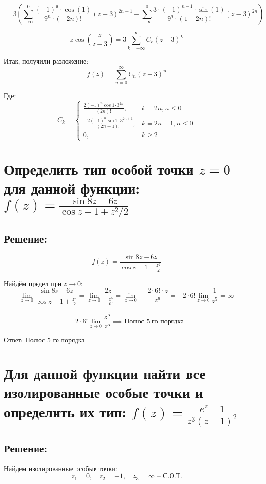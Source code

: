 \documentclass{article}
\begin{document}
\[
 = 3 \left(\sum_{-\infty}^{0} \frac{(-1)^n \cdot \cos(1)}{9^n \cdot (-2n)!} (z-3)^{2n + 1} - \sum_{-\infty}^{0} \frac{3 \cdot (-1)^{n-1} \cdot \sin(1)}{9^n \cdot (1 - 2n)!} (z-3)^{2n}\right)
\]

\[
z \cos\left(\frac{z}{z-3}\right) = 3\sum_{k =-\infty}^{\infty} C_k(z - 3)^k
\]

Итак, получили разложение:
\[
f(z) = \sum_{n=0}^{\infty} C_n (z-3)^n
\]

Где:
\[
C_k = 
\begin{cases} 
\frac{2(-1)^n \cos 1 \cdot 3^{2n}}{(2n)!}, & k = 2n, n \leqslant 0 \\ 
\frac{-2(-1)^n \sin 1 \cdot 3^{2n+1}}{(2n+1)!}, & k = 2n+1, n \leqslant 0 \\ 
0, & k \geqslant 2 
\end{cases}
\]

\section{Определить тип особой точки $z = 0$ для данной функции: $f(z) = \frac{\sin 8z - 6z}{\cos z - 1 + z^2 / 2}$}
\subsection{Решение:}

\[
f(z) = \frac{\sin 8z - 6z}{\cos z - 1 + \frac{z^2}{2}}
\]

Найдём предел при $z \to 0$:
\[
\lim_{z \to 0} \frac{\sin 8z - 6z}{\cos z - 1 + \frac{z^2}{2}} = \lim_{z \to 0} \frac{2z}{-\frac{z^6}{6!}} = \lim_{z \to 0} - \frac{2\cdot  6! \cdot z}{z^6} = - 2\cdot6! \lim_{z \to 0} \frac{1}{z^5} = \infty
\]

\[
- 2\cdot6! \lim_{z \to 0} \frac{z^5}{z^5} \implies \text{Полюс 5-го порядка}
\]

Ответ: $\text{Полюс 5-го порядка}$


\section{Для данной функции найти все изолированные особые точки и определить их тип: $f(z) = \frac{e^z - 1}{z^3 (z + 1)^2}$}
\subsection{Решение:}

Найдем изолированные особые точки:
\[
z_1 = 0, \quad z_2 = -1, \quad z_3 = \infty \text{ – С.О.Т.}
\]
\end{document}
